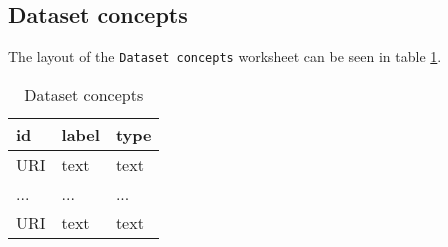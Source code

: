 \documentclass[a4paper,10pt]{article}
\begin{document}
\subsection{Dataset concepts}
The layout of the \texttt{Dataset concepts} worksheet can be seen in table \ref{table:Dataset concepts}.
\begin{table}[!h]
  \centering
  \caption{Dataset concepts}
  \label{table:Dataset concepts}
  \begin{tabular}{|l|l|l|}
    \hline
    \textbf{id} & \textbf{label} & \textbf{type} \\ \hline
    URI         & text           & text          \\ \hline
    ...         & ...            & ...           \\ \hline
    URI         & text           & text          \\ \hline
  \end{tabular}
\end{table}
\end{document}
